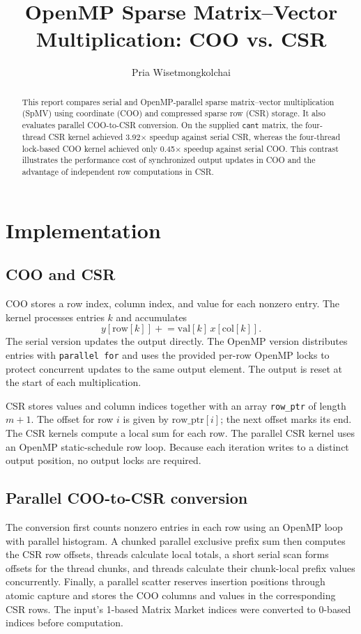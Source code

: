 \documentclass[sigconf,nonacm]{acmart}
\title{OpenMP Sparse Matrix–Vector Multiplication: COO vs. CSR}
\author{Pria Wisetmongkolchai}
\begin{document}
\begin{abstract}
This report compares serial and OpenMP-parallel sparse matrix--vector multiplication (SpMV) using coordinate (COO) and compressed sparse row (CSR) storage. It also evaluates parallel COO-to-CSR conversion. On the supplied \texttt{cant} matrix, the four-thread CSR kernel achieved 3.92$\times$ speedup against serial CSR, whereas the four-thread lock-based COO kernel achieved only 0.45$\times$ speedup against serial COO. This contrast illustrates the performance cost of synchronized output updates in COO and the advantage of independent row computations in CSR.
\end{abstract}
\maketitle
\section{Implementation}
\subsection{COO and CSR}
COO stores a row index, column index, and value for each nonzero entry. The kernel processes entries $k$ and accumulates
\begin{equation}
 y[\mathrm{row}[k]] \mathrel{+}= \mathrm{val}[k] \, x[\mathrm{col}[k]].
\end{equation}
The serial version updates the output directly. The OpenMP version distributes entries with \texttt{parallel for} and uses the provided per-row OpenMP locks to protect concurrent updates to the same output element. The output is reset at the start of each multiplication.

CSR stores values and column indices together with an array \texttt{row\_ptr} of length $m+1$. The offset for row $i$ is given by $\mathrm{row\_ptr}[i]$; the next offset marks its end. The CSR kernels compute a local sum for each row. The parallel CSR kernel uses an OpenMP static-schedule row loop. Because each iteration writes to a distinct output position, no output locks are required.

\subsection{Parallel COO-to-CSR conversion}
The conversion first counts nonzero entries in each row using an OpenMP loop with parallel histogram. A chunked parallel exclusive prefix sum then computes the CSR row offsets, threads calculate local totals, a short serial scan forms offsets for the thread chunks, and threads calculate their chunk-local prefix values concurrently. Finally, a parallel scatter reserves insertion positions through atomic capture and stores the COO columns and values in the corresponding CSR rows. The input's 1-based Matrix Market indices were converted to 0-based indices before computation.
\end{document}
